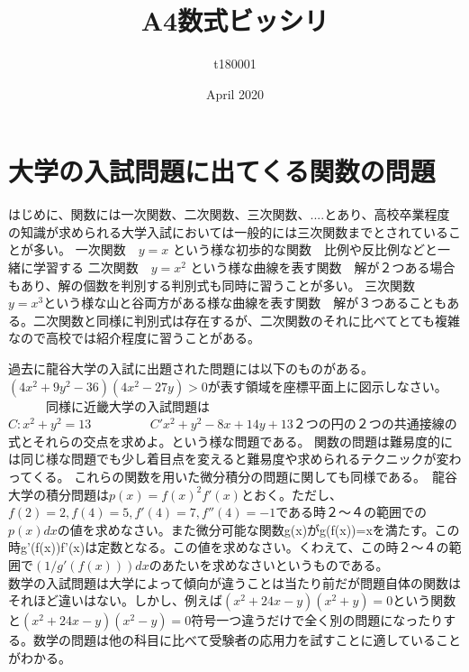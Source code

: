 \documentclass{article}
\title{A4数式ビッシリ}
\author{t180001 }
\date{April 2020}
\begin{document}
\maketitle

\section{大学の入試問題に出てくる関数の問題}
はじめに、関数には一次関数、二次関数、三次関数、....とあり、高校卒業程度の知識が求められる大学入試においては一般的には三次関数までとされていることが多い。
一次関数　$y=x$ という様な初歩的な関数　比例や反比例などと一緒に学習する
二次関数　$y=x^2$  という様な曲線を表す関数　解が２つある場合もあり、解の個数を判別する判別式も同時に習うことが多い。
三次関数　$y=x^3$という様な山と谷両方がある様な曲線を表す関数　解が３つあることもある。二次関数と同様に判別式は存在するが、二次関数のそれに比べてとても複雑なので高校では紹介程度に習うことがある。　

過去に龍谷大学の入試に出題された問題には以下のものがある。　　　　　$(4x^2+9y^2-36)(4x^2-27y)>0$が表す領域を座標平面上に図示しなさい。
　　　同様に近畿大学の入試問題は　　　　　　　　　　　　　　　　　　　　　　$C:x^2+y^2=13$   　　　　  $   C'x^2+y^2-8x+14y+13$２つの円の２つの共通接線の式とそれらの交点を求めよ。という様な問題である。
   関数の問題は難易度的には同じ様な問題でも少し着目点を変えると難易度や求められるテクニックが変わってくる。
   これらの関数を用いた微分積分の問題に関しても同様である。　龍谷大学の積分問題は$p(x)={f(x)}^2f'(x)$とおく。ただし、$f(2)=2,f(4)=5,f'(4)=7,f''(4)=-1$である時２〜４の範囲での$p(x)dx$の値を求めなさい。また微分可能な関数g(x)がg(f(x))=xを満たす。この時g'(f(x))f'(x)は定数となる。この値を求めなさい。くわえて、この時２〜４の範囲で$(1/g'(f(x)))dx$のあたいを求めなさいというものである。　　　　　　　　　　
数学の入試問題は大学によって傾向が違うことは当たり前だが問題自体の関数はそれほど違いはない。しかし、例えば$(x^2+24x-y)(x^2+y)=0$という関数と$(x^2+24x-y)(x^2-y)=0$符号一つ違うだけで全く別の問題になったりする。数学の問題は他の科目に比べて受験者の応用力を試すことに適していることがわかる。 
\end{document}
